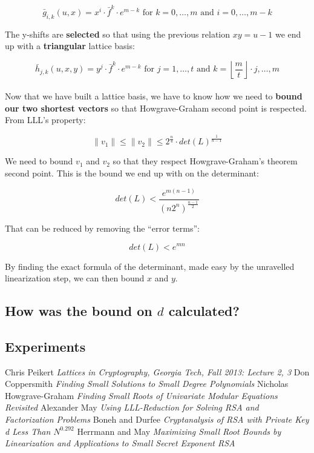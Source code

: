 \documentclass[a4paper,11pt]{article}
\begin{document}
\[ \bar{g}_{i,k}(u,x) = x^i \cdot \bar{f}^k \cdot e^{m-k} \text{ for } k = 0,\hdots,m \text{ and } i=0,\hdots,m-k \]

The y-shifts are \textbf{selected} so that using the previous relation $xy = u - 1$ we end up with a \textbf{triangular} lattice basis:

\[ \bar{h}_{j,k}(u,x,y) = y^j \cdot \bar{f}^k \cdot e^{m-k} \text{ for } j = 1,\hdots,t \text{ and } k=\left\lfloor\frac{m}{t}\right\rfloor\cdot j,\hdots,m \]\\

Now that we have built a lattice basis, we have to know how we need to \textbf{bound our two shortest vectors} so that Howgrave-Graham second point is respected. From LLL's property:

\[ \|v_1\| \leq \|v_2\| \leq 2^{\frac{n}{4}} \cdot det(L)^{\frac{1}{n-1}} \]

We need to bound $v_1$ and $v_2$ so that they respect Howgrave-Graham's theorem second point. This is the bound we end up with on the determinant:

\[ det(L) < \frac{e^{m(n-1)}}{(n2^n)^{\frac{n-1}{2}}} \]

That can be reduced by removing the ``error terms'':

\[ det(L) < e^{mn} \]

By finding the exact formula of the determinant, made easy by the unravelled linearization step, we can then bound $x$ and $y$.

\subsection{How was the bound on $d$ calculated?}\label{bound-boneh-durfee}

\subsection{Experiments}\label{boneh-durfee-experiments}

\newpage
\begin{thebibliography}{1}

 Chris Peikert {\em Lattices in Cryptography, Georgia Tech, Fall 2013: Lecture 2, 3}
 Don Coppersmith {\em Finding Small Solutions to Small Degree Polynomials}
 Nicholas Howgrave-Graham {\em Finding Small Roots of Univariate Modular Equations Revisited}
 Alexander May {\em Using LLL-Reduction for Solving RSA and Factorization Problems}
 Boneh and Durfee {\em Cryptanalysis of RSA with Private Key d Less Than $N^{0.292}$}
 Herrmann and May {\em Maximizing Small Root Bounds by Linearization and Applications to Small Secret Exponent RSA}


\end{thebibliography}
\end{document}
